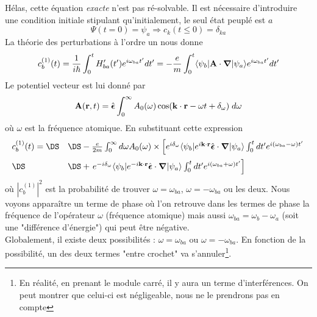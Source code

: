 Hélas, cette équation \textit{exacte} n'est pas ré-solvable. Il est nécessaire d'introduire une 
condition initiale stipulant qu'initialement, le seul état peuplé est $a$
\begin{equation}
\Psi (t=0) = \psi_a  \Rightarrow  c_k (t \leq 0) = \delta_{ka} 
\end{equation}
La théorie des perturbations à l'ordre un nous donne
\begin{equation}
c_b^{(1)} (t) = \frac{1}{i \hbar} \int_0^t H'_{ba}(t') e^{i \omega_{ba} t' } dt'
= -\frac{e}{m} \int_0^t 
   \langle \psi_b \vert {\bf A} \cdot \mbox{\boldmath $ \nabla $}  \vert \psi_a \rangle
   e^{i \omega_{ba} t' } dt'
\end{equation}
Le potentiel vecteur est lui donné par
\begin{equation}
  {\bf A} ({\bf r}, t) 
= \hat{  \mbox{\boldmath $ \epsilon $}}
\int_0^\infty A_0 (\omega) 
   \cos ( {\bf k} \cdot {\bf r} - \omega t + 
\delta_{\omega} )  \; d \omega
\end{equation}
où $\omega$ est la fréquence atomique. En substituant cette expression
\begin{equation}
\begin{array}{ll}
 c_b^{(1)} (t) = \DS&\DS-\frac{e}{2m} 
\int_0^\infty d\omega A_0(\omega)\times \left[ e^{i \delta_{\omega}} 
  \langle \psi_b \vert e^{i {\bf k} \cdot {\bf r} }
  \hat{  \mbox{\boldmath $ \epsilon $}} \cdot \mbox{\boldmath $ \nabla $}
  \vert \psi_a \rangle \int_0^t dt' e^{i(\omega_{ba} - \omega) t' } \right.\vspace{2mm}\\
\DS    &\DS+\left. e^{-i \delta_{\omega}} 
  \langle \psi_b \vert e^{-i {\bf k} \cdot {\bf r} }
  \hat{  \mbox{\boldmath $ \epsilon $}} \cdot \mbox{\boldmath $ \nabla $}
  \vert \psi_a \rangle \int_0^t dt' e^{i(\omega_{ba} + \omega) t'} \right]
\end{array}
\end{equation}
où $|c_b^{(1)}|^2$ est la probabilité de trouver $\omega=\omega_{ba}$, $\omega=-\omega_{ba}$ ou
les deux. Nous voyons apparaître un terme de phase où l'on retrouve dans les termes de phase la
fréquence de l'opérateur $\omega$ (fréquence atomique) mais aussi $\omega_{ba} = \omega_b-\omega_a$
(soit une "différence d'énergie") qui peut être négative.\\

Globalement, il existe deux possibilités : $\omega=\omega_{ba}$ ou $\omega=-\omega_{ba}$. En fonction
de la possibilité, un des deux termes "entre crochet" va s'annuler\footnote{En réalité, en prenant 
le module carré, il y aura un terme d'interférences. On peut montrer que celui-ci est  négligeable, 
nous ne le prendrons pas en compte}.\\


